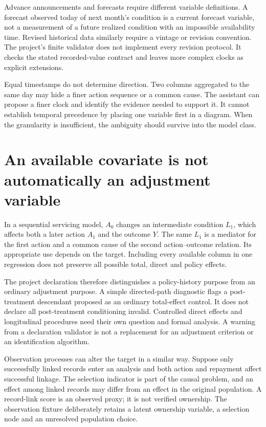 Advance announcements and forecasts require different variable definitions.
A forecast observed today of next month's condition is a current forecast
variable, not a measurement of a future realized condition with an impossible
availability time. Revised historical data similarly require a vintage or
revision convention. The project's finite validator does not implement every
revision protocol. It checks the stated recorded-value contract and leaves
more complex clocks as explicit extensions.

Equal timestamps do not determine direction. Two columns aggregated to the
same day may hide a finer action sequence or a common cause. The assistant
can propose a finer clock and identify the evidence needed to support it.
It cannot establish temporal precedence by placing one variable first in a
diagram. When the granularity is insufficient, the ambiguity should survive
into the model class.

\section{An available covariate is not automatically an adjustment variable}

In a sequential servicing model, \(A_0\) changes an intermediate condition
\(L_1\), which affects both a later action \(A_1\) and the outcome \(Y\).
The same \(L_1\) is a mediator for the first action and a common cause of the
second action--outcome relation. Its appropriate use depends on the target.
Including every available column in one regression does not preserve all
possible total, direct and policy effects.

The project declaration therefore distinguishes a policy-history purpose
from an ordinary adjustment purpose. A simple directed-path diagnostic flags
a post-treatment descendant proposed as an ordinary total-effect control.
It does not declare all post-treatment conditioning invalid. Controlled
direct effects and longitudinal procedures need their own question and
formal analysis. A warning from a declaration validator is not a replacement
for an adjustment criterion or an identification algorithm.

Observation processes can alter the target in a similar way. Suppose only
successfully linked records enter an analysis and both action and repayment
affect successful linkage. The selection indicator is part of the causal
problem, and an effect among linked records may differ from an effect in the
original population. A record-link score is an observed proxy; it is not
verified ownership. The observation fixture deliberately retains a latent
ownership variable, a selection node and an unresolved population choice.

